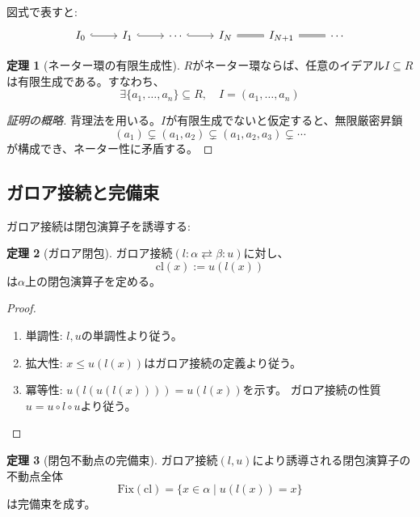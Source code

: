 \documentclass[a4paper,12pt]{ltjsarticle}
\theoremstyle{definition}
\newtheorem{theorem}{定理}[section]
\begin{document}
図式で表すと:
\begin{equation*}
\begin{tikzcd}
I_0 \arrow[r, hook] & I_1 \arrow[r, hook] & \cdots \arrow[r, hook] & I_N \arrow[r, equal] & I_{N+1} \arrow[r, equal] & \cdots
\end{tikzcd}
\end{equation*}

\begin{theorem}[ネーター環の有限生成性]\label{thm:noetherian-finitely-generated}
$R$がネーター環ならば、任意のイデアル$I \subseteq R$は有限生成である。すなわち、
\[
\exists \{a_1, \ldots, a_n\} \subseteq R, \quad I = (a_1, \ldots, a_n)
\]
\end{theorem}

\begin{proof}[証明の概略]
背理法を用いる。$I$が有限生成でないと仮定すると、無限厳密昇鎖
\[
(a_1) \subsetneq (a_1, a_2) \subsetneq (a_1, a_2, a_3) \subsetneq \cdots
\]
が構成でき、ネーター性に矛盾する。
\end{proof}

\subsection{ガロア接続と完備束}
ガロア接続は閉包演算子を誘導する:

\begin{theorem}[ガロア閉包]\label{thm:galois-closure}
ガロア接続$(l: \alpha \rightleftarrows \beta: u)$に対し、
\[
\text{cl}(x) := u(l(x))
\]
は$\alpha$上の閉包演算子を定める。
\end{theorem}

\begin{proof}
\begin{enumerate}
\item 単調性: $l, u$の単調性より従う。
\item 拡大性: $x \le u(l(x))$はガロア接続の定義より従う。
\item 冪等性: $u(l(u(l(x)))) = u(l(x))$を示す。
ガロア接続の性質$u = u \circ l \circ u$より従う。
\end{enumerate}
\end{proof}

\begin{theorem}[閉包不動点の完備束]\label{thm:closure-complete-lattice}
ガロア接続$(l, u)$により誘導される閉包演算子の不動点全体
\[
\text{Fix}(\text{cl}) = \{x \in \alpha \mid u(l(x)) = x\}
\]
は完備束を成す。
\end{theorem}
\end{document}
